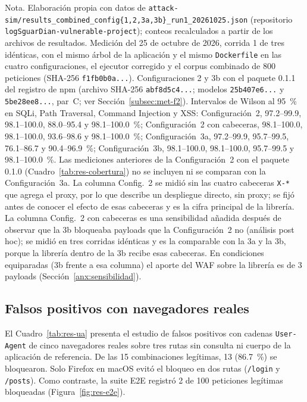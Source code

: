 {\footnotesize Nota. Elaboración propia con datos de
\texttt{attack-sim/results\_combined\_config\{1,2,3a,3b\}\_run1\_20261025.json} (repositorio
\texttt{logSguarDian-vulnerable-project}); conteos recalculados a partir de los archivos de
resultados. Medición del 25 de octubre de 2026, corrida 1 de tres idénticas, con el mismo árbol de
la aplicación y el mismo \texttt{Dockerfile} en las cuatro configuraciones, el ejecutor corregido y
el corpus combinado de 800 peticiones (SHA-256 \texttt{f1fb0b0a...}). Configuraciones 2 y 3b con el
paquete 0.1.1 del registro de npm (archivo SHA-256 \texttt{abf8d5c4...}; modelos \texttt{25b407e6...}
y \texttt{5be28ee8...}, par~C; ver Sección~\ref{subsec:met-f2}). Intervalos de Wilson al 95~\% en
SQLi, Path Traversal, Command Injection y XSS: Configuración~2, 97.2--99.9, 98.1--100.0,
88.0--95.4 y 98.1--100.0~\%; Configuración~2 con cabeceras, 98.1--100.0, 98.1--100.0, 93.6--98.6 y
98.1--100.0~\%; Configuración~3a, 97.2--99.9, 95.7--99.5, 76.1--86.7 y 90.4--96.9~\%;
Configuración~3b, 98.1--100.0, 98.1--100.0, 95.7--99.5 y 98.1--100.0~\%. Las mediciones anteriores
de la Configuración~2 con el paquete 0.1.0 (Cuadro~\ref{tab:res-cobertura}) no se incluyen ni se
comparan con la Configuración~3a. La columna Config.~2 se midió sin las cuatro cabeceras
\texttt{X-*} que agrega el proxy, por lo que describe un despliegue directo, sin proxy; se fijó
antes de conocer el efecto de esas cabeceras y es la cifra principal de la librería. La columna
Config.~2 con cabeceras es una sensibilidad añadida después de observar que la 3b bloqueaba
payloads que la Configuración~2 no (análisis post hoc); se midió en tres corridas idénticas y es la
comparable con la 3a y la 3b, porque la librería dentro de la 3b recibe esas cabeceras. En
condiciones equiparadas (3b frente a esa columna) el aporte del WAF sobre la librería es de 3
payloads (Sección~\ref{anx:sensibilidad}).}

\subsection{Falsos positivos con navegadores reales}

El Cuadro~\ref{tab:res-ua} presenta el estudio de falsos positivos con cadenas
\texttt{User-Agent} de cinco navegadores reales sobre tres rutas sin consulta ni cuerpo de la
aplicación de referencia. De las 15 combinaciones legítimas, 13 (86.7~\%) se bloquearon. Solo
Firefox en macOS evitó el bloqueo en dos rutas (\texttt{/login} y \texttt{/posts}). Como contraste,
la suite E2E registró 2 de 100 peticiones legítimas bloqueadas (Figura~\ref{fig:res-e2e}).

